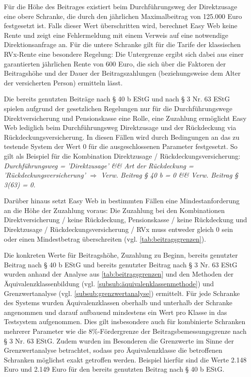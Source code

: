 Für die Höhe des Beitrages existiert beim Durchführungsweg der Direktzusage eine obere Schranke, die durch den jährlichen Maximalbeitrag von 125.000 Euro festgesetzt ist. Falls dieser Wert überschritten wird, berechnet Easy Web keine Rente und zeigt eine Fehlermeldung mit einem Verweis auf eine notwendige Direktionsanfrage an. Für die untere Schranke gilt für die Tarife der klassischen RVx-Rente eine besondere Regelung: Die Untergrenze ergibt sich dabei aus einer garantierten jährlichen Rente von 600 Euro, die sich über die Faktoren der Beitragshöhe und der Dauer der Beitragszahlungen (beziehungsweise dem Alter der versicherten Person) ermitteln lässt.

Die bereits genutzten Beiträge nach § 40 b EStG und nach § 3 Nr. 63 EStG spielen aufgrund der gesetzlichen Regelungen nur für die Durchführungswege Direktversicherung und Pensionskasse eine Rolle, eine Zuzahlung ermöglicht Easy Web lediglich beim Durchführungsweg Direktzusage und der Rückdeckung via Rückdeckungsversicherung. In diesen Fällen wird durch Bedingungen an das zu testende System der Wert 0 für die ausgeschlossenen Parameter festgesetzt. So gilt als Beispiel für die Kombination Direktzusage / Rückdeckungsversicherung: \textit{Durchführungsweg = 'Direktzusage' \&\& Art der Rückdeckung = 'Rückdeckungsversicherung' $\Rightarrow$ Verw. Beitrag § 40 b = 0 \&\& Verw. Beitrag § 3(63) = 0.}

Darüber hinaus setzt Easy Web in bestimmten Fällen eine Mindestanforderung an die Höhe der Zuzahlung voraus: Die Zuzahlung bei den Kombinationen Direktversicherung / keine Rückdeckung, Pensionskasse / keine Rückdeckung und Direktzusage / Rückdeckungsversicherung / RVx muss entweder gleich 0 sein oder einen Mindestbetrag überschreiten (vgl. \autoref{tab:beitragsgrenzen}).

\hspace{1cm}Die konkreten Werte für Beitragshöhe, Zuzahlung zu Beginn, bereits genutzter Beitrag nach § 40 b EStG und bereits genutzter Beitrag nach § 3 Nr. 63 EStG wurden anhand der Analyse aus \autoref{tab:beitragsgrenzen} und den Methoden der Äquivalenzklassenbildung (vgl. \autoref{subsub:äquivalenklassenmethode}) und Grenzwertanalyse (vgl. \autoref{subsub:grenzwertanalyse}) ermittelt. Für jede Schranke des Systems wurden Äquivalenzklassen oberhalb und unterhalb der Schranke angenommen und darauf aufbauend mindestens ein Wert pro Klasse in das Testsystem aufgenommen. Dies gilt insbesondere auch für kombinierte Schranken mehrerer Parameter wie die 8\%-Fördergrenze der Beitragsbemessungsgrenze nach § 3 Nr. 63 EStG. Zudem wurden im Besonderen die Grenzwerte im Sinne der Grenzwertanalyse betrachtet, sodass pro Äquivalenzklasse die betroffenen Schranken möglichst exakt getroffen werden. Beispiel hierfür sind die Werte 2.148 Euro und 2.149 Euro für den bereits genutzten Beitrag nach § 40 b EStG. 


